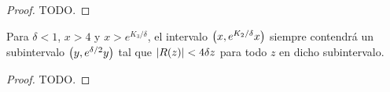 \begin{proof}
    TODO.
\end{proof}

\begin{lemma}
    Para \(\delta < 1\), \(x > 4\) y \(x > e^{K_3/\delta}\),
    el intervalo \(\left( x, e^{K_2/\delta}x \right)\) siempre contendr\'a
    un subintervalo \(\left( y, e^{\delta/2}y \right)\) tal que
    \(\left\lvert R(z) \right\rvert < 4 \delta z\) para todo \(z\) en dicho subintervalo.
\end{lemma}

\begin{proof}
    TODO.
\end{proof}
